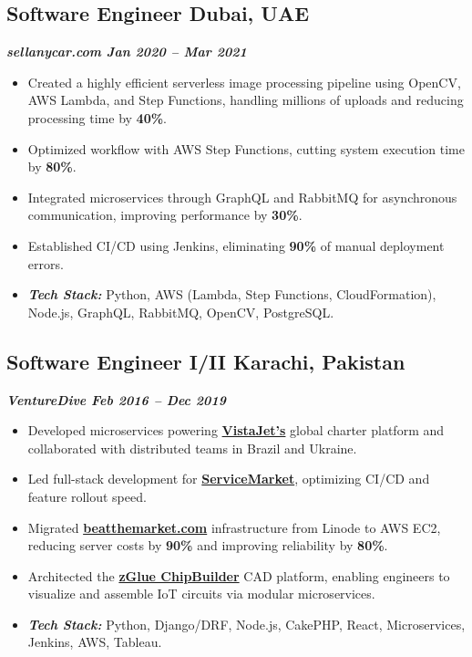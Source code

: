 \documentclass[a4paper,11pt]{article}
\begin{document}
\subsection*{Software Engineer \hfill Dubai, UAE}
\vspace{-0.6em}
\textbf{\textit{sellanycar.com \hfill Jan 2020 -- Mar 2021}}
\vspace{-0.6em}
\begin{itemize}
    \item Created a highly efficient serverless image processing pipeline using OpenCV, AWS Lambda, and Step Functions, handling millions of uploads and reducing processing time by \textbf{40\%}.
    \item Optimized workflow with AWS Step Functions, cutting system execution time by \textbf{80\%}.
    \item Integrated microservices through GraphQL and RabbitMQ for asynchronous communication, improving performance by \textbf{30\%}.
    \item Established CI/CD using Jenkins, eliminating \textbf{90\%} of manual deployment errors.
    \item \textit{\textbf{Tech Stack:}} Python, AWS (Lambda, Step Functions, CloudFormation), Node.js, GraphQL, RabbitMQ, OpenCV, PostgreSQL.
\end{itemize}

\subsection*{Software Engineer I/II \hfill Karachi, Pakistan}
\vspace{-0.6em}
\textbf{\textit{VentureDive \hfill Feb 2016 -- Dec 2019}}
\vspace{-0.6em}
\begin{itemize}
    \item Developed microservices powering \href{https://vistajet.com}{\textbf{VistaJet's}} global charter platform and collaborated with distributed teams in Brazil and Ukraine.
    \item Led full-stack development for \href{https://servicemarket.com}{\textbf{ServiceMarket}}, optimizing CI/CD and feature rollout speed.
    \item Migrated \href{https://insurancemarket.com}{\textbf{beatthemarket.com}} infrastructure from Linode to AWS EC2, reducing server costs by \textbf{90\%} and improving reliability by \textbf{80\%}.
    \item Architected the \href{https://www.linkedin.com/company/zglue/}{\textbf{zGlue ChipBuilder}} CAD platform, enabling engineers to visualize and assemble IoT circuits via modular microservices.
    \item \textit{\textbf{Tech Stack:}} Python, Django/DRF, Node.js, CakePHP, React, Microservices, Jenkins, AWS, Tableau.
\end{itemize}
\end{document}
